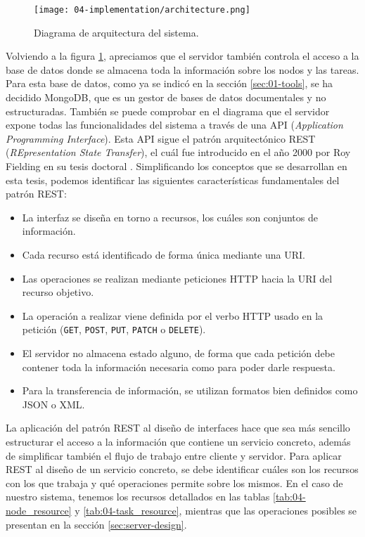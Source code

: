 \begin{figure}
    \centering
    \texttt{[image: 04-implementation/architecture.png]}
    \caption{Diagrama de arquitectura del sistema.}
    \label{fig:04-architecture}
\end{figure}

Volviendo a la figura \ref{fig:04-architecture}, apreciamos que el servidor
también controla el acceso a la base de datos donde se almacena toda la
información sobre los nodos y las tareas. Para esta base de datos, como ya se
indicó en la sección \ref{sec:01-tools}, se ha decidido MongoDB, que es un gestor
de bases de datos documentales y no estructuradas. También se puede comprobar en
el diagrama que el servidor expone todas las funcionalidades del sistema a
través de una API (\textit{Application Programming Interface}). Esta API sigue
el patrón arquitectónico REST (\textit{REpresentation State Transfer}), el cuál
fue introducido en el año 2000 por Roy Fielding en su tesis doctoral
\cite{fielding_architectural_2000}. Simplificando los conceptos que se
desarrollan en esta tesis, podemos identificar las siguientes características
fundamentales del patrón REST:

\begin{itemize}
    \item La interfaz se diseña en torno a recursos, los cuáles son conjuntos de
          información.
    \item Cada recurso está identificado de forma única mediante una URI.
    \item Las operaciones se realizan mediante peticiones HTTP hacia la URI del
          recurso objetivo.
    \item La operación a realizar viene definida por el verbo HTTP usado en la
          petición (\texttt{GET}, \texttt{POST}, \texttt{PUT}, \texttt{PATCH} o
          \texttt{DELETE}).
    \item El servidor no almacena estado alguno, de forma que cada petición debe
          contener toda la información necesaria como para poder darle respuesta.
    \item Para la transferencia de información, se utilizan formatos bien
          definidos como JSON o XML.
\end{itemize}

La aplicación del patrón REST al diseño de interfaces hace que sea más sencillo
estructurar el acceso a la información que contiene un servicio concreto, además
de simplificar también el flujo de trabajo entre cliente y servidor. Para
aplicar REST al diseño de un servicio concreto, se debe identificar cuáles son
los recursos con los que trabaja y qué operaciones permite sobre los mismos. En
el caso de nuestro sistema, tenemos los recursos detallados en las tablas
\ref{tab:04-node_resource} y \ref{tab:04-task_resource}, mientras que las
operaciones posibles se presentan en la sección \ref{sec:server-design}.

